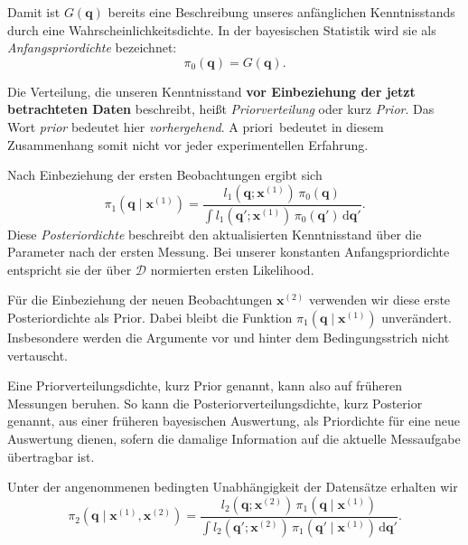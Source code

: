 Damit ist $G(\mathbf q)$ bereits eine Beschreibung unseres
anfänglichen Kenntnisstands durch eine Wahrscheinlichkeitsdichte.
In der bayesischen Statistik wird sie als
\textsl{Anfangspriordichte} bezeichnet:
\[
\pi_0(\mathbf q)=G(\mathbf q).
\]

Die Verteilung, die unseren Kenntnisstand \textbf{vor Einbeziehung
der jetzt betrachteten Daten} beschreibt, heißt
\textsl{Priorverteilung} oder kurz \textsl{Prior}. Das Wort
\textsl{prior} bedeutet hier \textsl{vorhergehend}.
\glqq A priori\grqq ~bedeutet in diesem Zusammenhang somit nicht
\glqq vor jeder experimentellen Erfahrung\grqq.

Nach Einbeziehung der ersten Beobachtungen ergibt sich
\begin{equation}
\pi_1(\mathbf q\mid\mathbf x^{(1)})
=
\frac{
l_1(\mathbf q;\mathbf x^{(1)})\,\pi_0(\mathbf q)
}{
\displaystyle\int
l_1(\mathbf q';\mathbf x^{(1)})\,\pi_0(\mathbf q')
\,\mathrm d\mathbf q'
}.
\end{equation}
Diese \textsl{Posteriordichte} beschreibt den aktualisierten
Kenntnisstand über die Parameter nach der ersten Messung.
Bei unserer konstanten Anfangspriordichte entspricht sie
der über $\mathcal D$ normierten ersten Likelihood.

Für die Einbeziehung der neuen Beobachtungen
$\mathbf x^{(2)}$ verwenden wir diese erste Posteriordichte
als Prior. Dabei bleibt die Funktion
$\pi_1(\mathbf q\mid\mathbf x^{(1)})$ unverändert.
Insbesondere werden die Argumente vor und hinter dem
Bedingungsstrich nicht vertauscht.

Eine Priorverteilungsdichte, kurz Prior genannt, kann also auf früheren Messungen beruhen.
So kann die Posteriorverteilungsdichte, kurz Posterior genannt,
aus einer früheren bayesischen Auswertung,
als Priordichte für eine neue Auswertung dienen, sofern die damalige Information auf
die aktuelle Messaufgabe übertragbar ist.

Unter der angenommenen bedingten Unabhängigkeit der
Datensätze erhalten wir
\begin{equation}
\pi_2(\mathbf q\mid\mathbf x^{(1)},\mathbf x^{(2)})
=
\frac{
l_2(\mathbf q;\mathbf x^{(2)})
\,\pi_1(\mathbf q\mid\mathbf x^{(1)})
}{
\displaystyle\int
l_2(\mathbf q';\mathbf x^{(2)})
\,\pi_1(\mathbf q'\mid\mathbf x^{(1)})
\,\mathrm d\mathbf q'
}.
\label{eq:posteriorinterpretation}
\end{equation}

